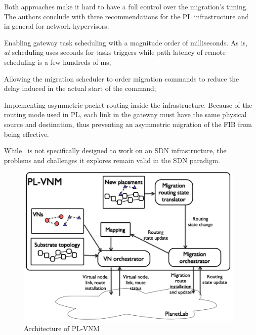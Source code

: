 Both approaches make it hard to have a full control over the migration's timing.
The authors conclude with three recommendations for the PL infrastructure and in general for network hypervisors.
\begin{inparaenum}[i)]
\item Enabling gateway task scheduling with a magnitude order of milliseconds. As is, \textit{at} scheduling uses seconds for tasks triggers while path latency of remote scheduling is a few hundreds of ms;
\item Allowing the migration scheduler to order migration commands to reduce the delay induced in the actual start of the command;
\item Implementing asymmetric packet routing inside the infrastructure.
Because of the routing mode used in PL, each link in the gateway must have the same physical source and destination, thus preventing an asymmetric migration of the FIB from being effective. 
\end{inparaenum}

While~\cite{Lo2014} is not specifically designed to work on an SDN infrastructure, the problems and challenges it explores remain valid in the SDN paradigm.

\begin{figure}[ht]
    \centering
    \includegraphics[scale=0.5]{figures/pl-vnm.png}
    \caption{Architecture of PL-VNM~\cite{Lo2014}}
    \label{fig:plvnm}
\end{figure}

